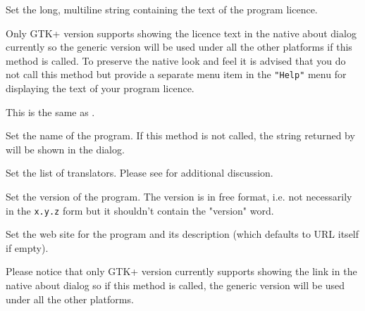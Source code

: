 \label{wxaboutdialoginfosetlicence}


Set the long, multiline string containing the text of the program licence.

Only GTK+ version supports showing the licence text in the native about dialog
currently so the generic version will be used under all the other platforms if
this method is called. To preserve the native look and feel it is advised that
you do not call this method but provide a separate menu item in the 
\texttt{"Help"} menu for displaying the text of your program licence.


\label{wxaboutdialoginfosetlicense}


This is the same as .


\label{wxaboutdialoginfosetname}


Set the name of the program. If this method is not called, the string returned
by  will be shown in the dialog.


\label{wxaboutdialoginfosettranslators}


Set the list of translators. Please see 
 for additional
discussion.


\label{wxaboutdialoginfosetversion}


Set the version of the program. The version is in free format, i.e. not
necessarily in the \texttt{x.y.z} form but it shouldn't contain the "version"
word.


\label{wxaboutdialoginfosetwebsite}


Set the web site for the program and its description (which defaults to URL
itself if empty).

Please notice that only GTK+ version currently supports showing the link in the
native about dialog so if this method is called, the generic version will be
used under all the other platforms.


